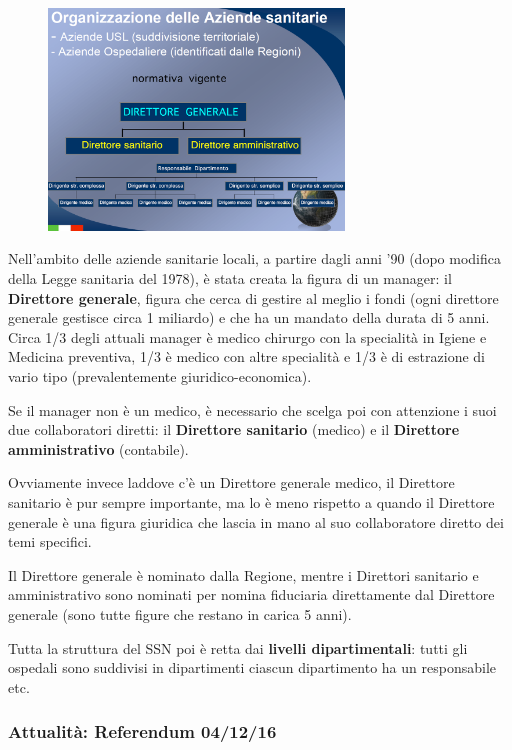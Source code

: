 \begin{figure}[!ht]
\centering
	\includegraphics[width=0.7\textwidth]{13/image1.png}
	\end{figure}

Nell'ambito delle aziende sanitarie locali, a partire dagli anni '90 (dopo modifica della Legge sanitaria del 1978), è stata creata la figura di un manager: il \textbf{Direttore generale}, figura che cerca di gestire al meglio i fondi (ogni direttore generale gestisce circa 1 miliardo) e che ha un mandato della durata di 5 anni. Circa 1/3 degli attuali manager è medico chirurgo con la specialità in Igiene e Medicina preventiva, 1/3 è medico con altre specialità e 1/3 è di estrazione di vario tipo (prevalentemente giuridico-economica).

Se il manager non è un medico, è necessario che scelga poi con attenzione i suoi due collaboratori diretti: il \textbf{Direttore sanitario} (medico) e il \textbf{Direttore amministrativo} (contabile).

Ovviamente invece laddove c'è un Direttore generale medico, il Direttore sanitario è pur sempre importante, ma lo è meno rispetto a quando il Direttore generale è una figura giuridica che lascia in mano al suo collaboratore diretto dei temi specifici.

Il Direttore generale è nominato dalla Regione, mentre i Direttori sanitario e amministrativo sono nominati per nomina fiduciaria
direttamente dal Direttore generale (sono tutte figure che restano in carica 5 anni).

Tutta la struttura del SSN poi è retta dai \textbf{livelli dipartimentali}: tutti gli ospedali sono suddivisi in dipartimenti ciascun dipartimento ha un responsabile etc.

\subsubsection{Attualità: Referendum 04/12/16}

